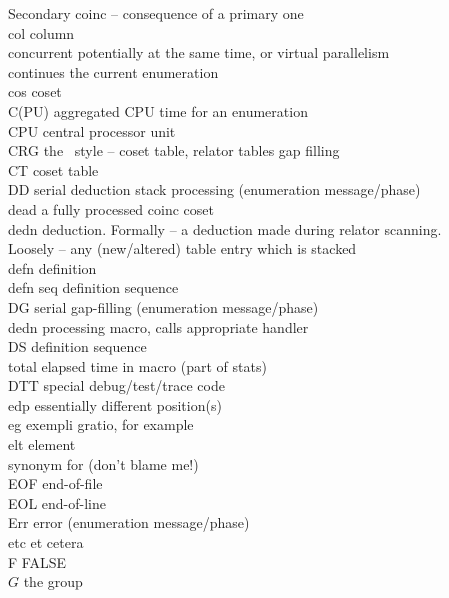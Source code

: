\begin{tabbing}
	   	\> Secondary coinc -- consequence of a primary one \\
col	   	\> column \\
concurrent 	\> potentially at the same time, or virtual parallelism \\
\> continues the current enumeration \\
cos  	   	\> coset \\
C(PU)	   	\> aggregated CPU time for an enumeration \\
CPU        	\> central processor unit \\
CRG        	\> the \pace\ style -- coset table, relator tables \amp gap filling \\
CT	   	\> coset table \\
DD         	\> serial deduction stack processing (enumeration message/phase) \\
dead       	\> a fully processed coinc coset \\
dedn       	\> deduction.  Formally -- a deduction made during relator scanning. \\
	   	\> Loosely -- any (new/altered) table entry which is stacked \\
defn       	\> definition \\
defn seq   	\> definition sequence \\
DG         	\> serial gap-filling (enumeration message/phase) \\
	\> dedn processing macro, calls appropriate handler \\
DS         	\> definition sequence \\
	\> total elapsed time in  macro (part of stats) \\
DTT        	\> special debug/test/trace code \\
edp        	\> essentially different position(s) \\
eg	   	\> exempli gratio, for example \\
elt	   	\> element \\
	\> synonym for  (don't blame me!) \\
EOF	   	\> end-of-file \\
EOL	   	\> end-of-line \\
Err        	\> error (enumeration message/phase) \\
etc	   	\> et cetera \\
F          	\> FALSE \\
$G$	   	\> the group \\

\end{tabbing}
